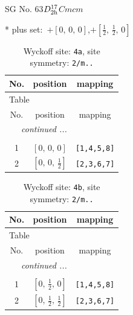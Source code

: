\documentclass[fleqn,8pt]{jsarticle}
\begin{document}
\setcounter{MaxMatrixCols}{32}

\renewcommand{\tablename}{Table~}
\renewcommand{\figurename}{Figure~}
\begin{center}
\LARGE
SG No. 63\quad$D_{\rm 2h}^{17}$\quad$Cmcm$\quad[ orthorhombic ]
\end{center}
* plus set:\,\,\,$+\left[ 0,\, 0,\, 0 \right]$,\quad $+\left[ \frac{1}{2},\, \frac{1}{2},\, 0 \right]$
\renewcommand{\arraystretch}{1.2}
\begin{longtable}{ccc}
\caption{Wyckoff site: {\tt 4a}, site symmetry: {\tt 2/m..}}
 \\
 \hline \hline
No. & position & mapping \\ \hline \endfirsthead

\multicolumn{2}{l}{\tablename\ \thetable{}} \\
 \hline \hline
No. & position & mapping \\ \hline \endhead

 \hline \hline
\multicolumn{2}{r}{\footnotesize\it continued ...} \\ \endfoot

 \hline \hline
\multicolumn{2}{r}{} \\ \endlastfoot

1 & $\left[ 0,\, 0,\, 0 \right]$ & {\tt [1,4,5,8]} \\ \hline
2 & $\left[ 0,\, 0,\, \frac{1}{2} \right]$ & {\tt [2,3,6,7]} \\
\end{longtable}
\renewcommand{\arraystretch}{1.2}
\begin{longtable}{ccc}
\caption{Wyckoff site: {\tt 4b}, site symmetry: {\tt 2/m..}}
 \\
 \hline \hline
No. & position & mapping \\ \hline \endfirsthead

\multicolumn{2}{l}{\tablename\ \thetable{}} \\
 \hline \hline
No. & position & mapping \\ \hline \endhead

 \hline \hline
\multicolumn{2}{r}{\footnotesize\it continued ...} \\ \endfoot

 \hline \hline
\multicolumn{2}{r}{} \\ \endlastfoot

1 & $\left[ 0,\, \frac{1}{2},\, 0 \right]$ & {\tt [1,4,5,8]} \\ \hline
2 & $\left[ 0,\, \frac{1}{2},\, \frac{1}{2} \right]$ & {\tt [2,3,6,7]} \\
\end{longtable}
\end{document}
